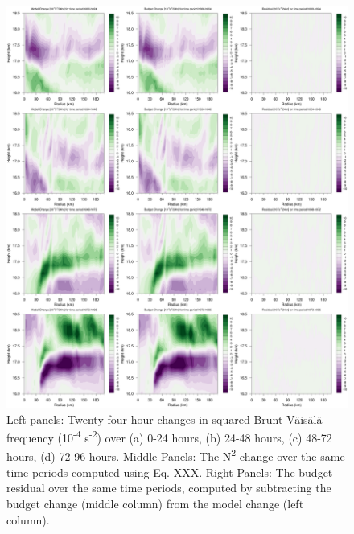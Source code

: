 \documentclass{ametsoc}
\begin{document}
\begin{figure}[ht]
\centerline{\includegraphics[width=39pc]{figures/fig03_R-Z_mod+bud+res.png}}
\caption{Left panels: Twenty-four-hour changes in squared Brunt-V{\"a}is{\"a}l{\"a} frequency (10\textsuperscript{-4} s\textsuperscript{-2}) over (a) 0-24 hours, (b) 24-48 hours, (c) 48-72 hours, (d) 72-96 hours. Middle Panels: The N\textsuperscript{2} change over the same time periods computed using Eq. XXX. Right Panels: The budget residual over the same time periods, computed by subtracting the budget change (middle column) from the model change (left column).}
\label{fig:modbudres}
\end{figure}
\end{document}
